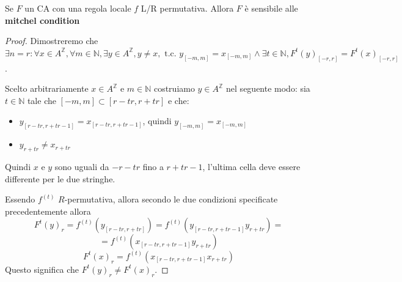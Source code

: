 \begin{nota}
    Se $F$ un CA con una regola locale $f$ L/R permutativa. Allora $F$ è sensibile 
    alle \textbf{mitchel condition}
    \begin{proof}
        Dimostreremo che $\exists n=r: \forall x\in A^\mathbb{Z}, \forall m\in \mathbb{N},
        \exists y \in A^\mathbb{Z}, y\ne x, \text{ t.c. } y_{[-m,m]} = x_{[-m,m]}\land 
        \exists t\in \mathbb{N},F^t(y)_{[-r,r]} =F^t(x)_{[-r,r]}$.

        Scelto arbitrariamente $x\in A^\mathbb{Z}$ e $m\in \mathbb{N}$ costruiamo
        $y\in A^\mathbb{Z}$ nel seguente modo: sia $t\in\mathbb{N}$ tale che 
        $[-m,m]\subset [r-tr,r+tr]$ e che:
        \begin{itemize}
            \item $y_{[r-tr, r+tr-1]} = x_{[r-tr, r+tr-1]}$, quindi $y_{[-m,m]} = x_{[-m,m]}$
            \item $y_{r+tr} \ne x_{r+tr}$
        \end{itemize} 
        Quindi $x$ e $y$ sono uguali da $-r-tr$ fino a $r+tr-1$, l'ultima cella 
        deve essere differente per le due stringhe.

        Essendo $f^{(t)}$ $R$-permutativa, allora secondo le due condizioni 
        specificate precedentemente allora 
        $$F^t(y)_r=f^{(t)}(y_{[r-tr, r+tr]})=f^{(t)}(y_{[r-tr, r+tr-1]}y_{r+tr})=$$
        $$=f^{(t)}(x_{[r-tr, r+tr-1]}y_{r+tr})$$
        $$F^t(x)_r=f^{(t)}(x_{[r-tr, r+tr-1]}x_{r+tr}) $$
        Questo significa che $F^t(y)_r \ne F^t(x)_r$.
    \end{proof}
\end{nota}